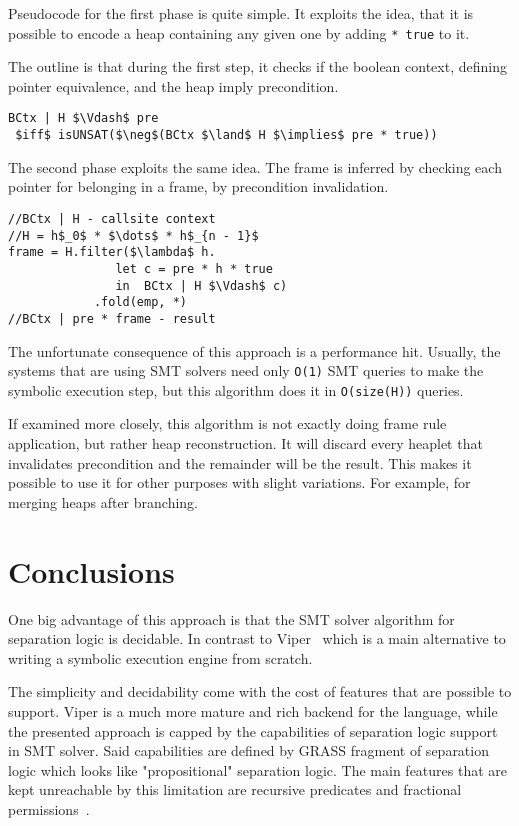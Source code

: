 \documentclass[sigplan,screen,review]{acmart}
\begin{document}
Pseudocode for the first phase is quite simple. It exploits the idea, that it is possible to encode a heap containing any given one by adding \texttt{* true} to it. 

The outline is that during the first step, it checks if the boolean context, defining pointer equivalence, and the heap imply precondition.

\begin{lstlisting}[mathescape]
BCtx | H $\Vdash$ pre 
 $iff$ isUNSAT($\neg$(BCtx $\land$ H $\implies$ pre * true))
\end{lstlisting}

The second phase exploits the same idea. The frame is inferred by checking each pointer for belonging in a frame, by precondition invalidation.

\begin{lstlisting}[mathescape]
//BCtx | H - callsite context
//H = h$_0$ * $\dots$ * h$_{n - 1}$
frame = H.filter($\lambda$ h. 
               let c = pre * h * true 
               in  BCtx | H $\Vdash$ c)
            .fold(emp, *)
//BCtx | pre * frame - result
\end{lstlisting}

The unfortunate consequence of this approach is a performance hit. Usually, the systems that are using SMT solvers need only \texttt{O(1)} SMT queries to make the symbolic execution step, but this algorithm does it in \texttt{O(size(H))} queries. 

If examined more closely, this algorithm is not exactly doing frame rule application, but rather heap reconstruction. It will discard every heaplet that invalidates precondition and the remainder will be the result. This makes it possible to use it for other purposes with slight variations. For example, for merging heaps after branching. 

\section{Conclusions}

One big advantage of this approach is that the SMT solver algorithm for separation logic is decidable. In contrast to Viper~\cite{muller2016viper} which is a main alternative to writing a symbolic execution engine from scratch. 

The simplicity and decidability come with the cost of features that are possible to support. Viper is a much more mature and rich backend for the language, while the presented approach is capped by the capabilities of separation logic support in SMT solver. Said capabilities are defined by GRASS fragment of separation logic which looks like "propositional" separation logic. The main features that are kept unreachable by this limitation are recursive predicates and fractional permissions~\cite{boyland2003checking}. 
\end{document}
